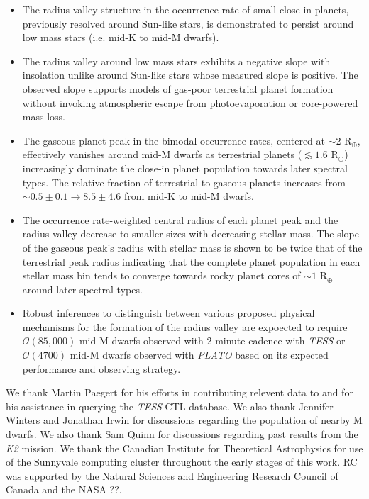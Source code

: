 \documentclass[twocolumn]{emulateapj}
\newcommand{\ktwo}[1]{\emph{K2}#1}
\newcommand{\tess}[1]{\emph{TESS}#1}
\newcommand{\plato}[1]{\emph{PLATO}#1}
\begin{document}
\begin{itemize}
\item The radius valley structure in the occurrence rate of small close-in planets,
  previously resolved around Sun-like
  stars, is demonstrated to persist around low mass stars (i.e. mid-K to mid-M dwarfs).
\item The radius valley around low mass stars exhibits a negative slope with insolation unlike 
  around Sun-like stars whose measured slope is positive. The observed slope
  supports models of gas-poor terrestrial planet formation without invoking atmospheric escape from photoevaporation
  or core-powered mass loss.
\item The gaseous planet peak in the bimodal occurrence rates, centered at $\sim 2$ R$_{\oplus}$, effectively
  vanishes around mid-M dwarfs as terrestrial planets ($\lesssim 1.6$ R$_{\oplus}$) increasingly dominate the close-in
  planet population towards later spectral types. The relative fraction of terrestrial to gaseous planets increases
  from $\sim 0.5\pm 0.1 \to 8.5\pm 4.6$ from mid-K to mid-M dwarfs.
\item The occurrence rate-weighted central radius of each planet peak and the radius valley decrease to smaller
  sizes with decreasing stellar mass. The slope of the gaseous peak's radius with stellar mass is shown to be
  twice that of the terrestrial peak radius indicating that the complete planet population in each stellar mass bin
  tends to converge towards rocky planet cores of $\sim 1$ R$_{\oplus}$ around later spectral types.
\item Robust inferences to distinguish between various proposed physical mechanisms for the formation of the
  radius valley are expoected to require $\mathcal{O}(85,000)$ mid-M dwarfs observed with 2 minute cadence with
  \tess{} or $\mathcal{O}(4700)$ mid-M dwarfs observed with \plato{} based on its expected performance and
  observing strategy. 
\end{itemize}




\acknowledgements
We thank Martin Paegert for his efforts in contributing relevent data to and for his assistance in querying the \tess{}
CTL database. We also thank Jennifer Winters and Jonathan Irwin for discussions regarding the population of nearby
M dwarfs. We also thank Sam Quinn for discussions regarding past results from the \ktwo{} mission.
We thank the Canadian Institute for Theoretical Astrophysics for use of the Sunnyvale computing cluster
throughout the early stages of this work. RC was supported by the Natural Sciences and Engineering Research Council of
Canada and the NASA ??. 




\end{document}

